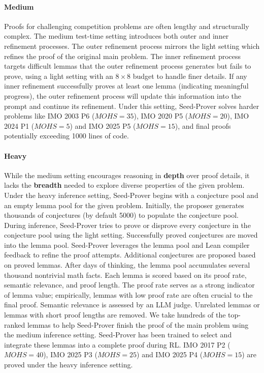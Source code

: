 \paragraph{Medium}
Proofs for challenging competition problems are often lengthy and structurally complex. The medium test-time setting introduces both outer and inner refinement processes. The outer refinement process mirrors the light setting which refines the proof of the original main problem. The inner refinement process targets difficult lemmas that the outer refinement process generates but fails to prove, using a light setting with an $8 \times 8$ budget to handle finer details. If any inner refinement successfully proves at least one lemma (indicating meaningful progress), the outer refinement process will update this information into the prompt and continue its refinement.
Under this setting, Seed-Prover solves harder problems like IMO 2003 P6 ($\textit{MOHS}=35$), IMO 2020 P5 ($\textit{MOHS}=20$), IMO 2024 P1 ($\textit{MOHS}=5$) and IMO 2025 P5 ($\textit{MOHS}=15$), and final proofs potentially exceeding 1000 lines of code. 

\paragraph{Heavy} While the medium setting encourages reasoning in \textbf{depth} over proof details, it lacks the \textbf{breadth} needed to explore diverse properties of the given problem.
Under the heavy inference setting, Seed-Prover begins with a conjecture pool and an empty lemma pool for the given problem. Initially, the proposer generates thousands of conjectures (by default 5000) to populate the conjecture pool.
During inference, Seed-Prover tries to prove or disprove every conjecture in the conjecture pool using the light setting. Successfully proved conjectures are moved into the lemma pool. Seed-Prover leverages the lemma pool and Lean compiler feedback to refine the proof attempts.
Additional conjectures are proposed based on proved lemmas.
After days of thinking, the lemma pool accumulates several thousand nontrivial math facts. Each lemma is scored based on its proof rate, semantic relevance, and proof length. The proof rate serves as a strong indicator of lemma value; empirically, lemmas with low proof rate are often crucial to the final proof. Semantic relevance is assessed by an LLM judge. Unrelated lemmas or lemmas with short proof lengths are removed. We take hundreds of the top-ranked lemmas to help Seed-Prover finish the proof of the main problem using the medium inference setting. Seed-Prover has been trained to select and integrate these lemmas into a complete proof during RL.
IMO 2017 P2 ($\textit{MOHS}=40$), IMO 2025 P3 ($\textit{MOHS}=25$) and IMO 2025 P4 ($\textit{MOHS}=15$) are proved under the heavy inference setting. 